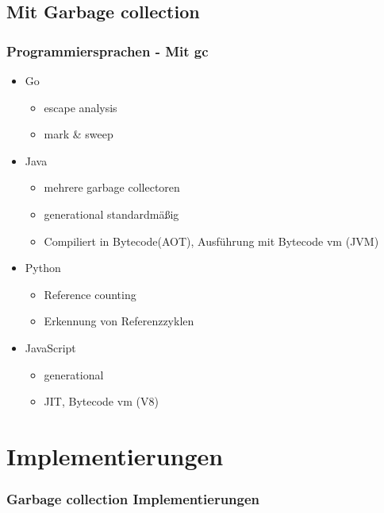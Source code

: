 \documentclass{beamer}
\begin{document}
        \subsection{Mit Garbage collection}
            \begin{frame}
                \frametitle{Programmiersprachen - Mit gc}
                \begin{itemize}
                    \item Go
                    \begin{itemize}
                        \item escape analysis
                        \item mark \& sweep
                    \end{itemize}
                    \item Java
                    \begin{itemize}
                        \item mehrere garbage collectoren
                        \item generational standardmäßig
                        \item Compiliert in Bytecode(AOT), Ausführung mit Bytecode vm (JVM)
                    \end{itemize}
                    \item Python
                    \begin{itemize}
                        \item Reference counting
                        \item Erkennung von Referenzzyklen
                    \end{itemize}
                    \item JavaScript
                    \begin{itemize}
                        \item generational
                        \item JIT, Bytecode vm (V8)
                    \end{itemize}
                \end{itemize}
            \end{frame}

    \section{Implementierungen}
        \begin{frame}
            \frametitle{Garbage collection Implementierungen}
        \end{frame}
\end{document}
